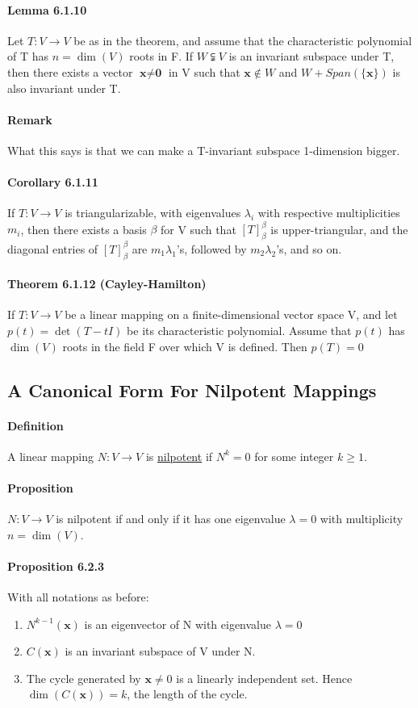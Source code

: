 \documentclass[11pt]{article}
\newcommand{\tb}[1]{\textbf{#1}}
\newcommand{\under}[1]{\underline{#1}}
\newcommand{\vx}[0]{\tb{x}}
\newcommand{\vo}[0]{\tb{0}}
\begin{document}
{\paragraph{Lemma 6.1.10} Let $T: V \rightarrow V$ be as in the theorem, and assume that the characteristic polynomial of T has $n = \dim(V)$ roots in F. If $W \subsetneqq V$ is an invariant subspace under T, then there exists a vector $\vx \neq\vo$ in V such that $\vx \notin W$ and $W + Span(\{\vx\})$ is also invariant under T.
\paragraph{Remark}
What this says is that we can make a T-invariant subspace 1-dimension bigger.
\paragraph{Corollary 6.1.11} If $T: V \rightarrow V$ is triangularizable, with eigenvalues $\lambda_i$ with respective multiplicities $m_i$, then there exists a basis $\beta$ for V such that $[T]_\beta^\beta$ is upper-triangular, and the diagonal entries of $[T]_\beta^\beta$ are $m_1\lambda_1$'s, followed by $m_2 \lambda_2$'s, and so on.
\paragraph{Theorem 6.1.12 (Cayley-Hamilton)} If $T: V \rightarrow V$ be a linear mapping on a finite-dimensional vector space V, and let $p(t) = \det(T - tI)$ be its characteristic polynomial. Assume that $p(t)$ has $\dim(V)$ roots in the field F over which V is defined. Then $p(T) = 0$ 
\subsection{A Canonical Form For Nilpotent Mappings}
\paragraph{Definition} A linear mapping $N: V \rightarrow V$ is \under{nilpotent} if $N^k = 0$ for some integer $k \geq 1$.
\paragraph{Proposition} $N: V \rightarrow V$ is nilpotent if and only if it has one eigenvalue $\lambda = 0$ with multiplicity $n = \dim(V)$.
\paragraph{Proposition 6.2.3} With all notations as before:
\begin{enumerate}
	\item $N^{k-1}(\vx)$ is an eigenvector of N with eigenvalue $\lambda = 0$
	\item $C(\vx)$ is an invariant subspace of V under N.
	\item The cycle generated by $\vx \neq 0$ is a linearly independent set. Hence $\dim(C(\vx)) = k$, the length of the cycle.
\end{enumerate}
}
\end{document}
